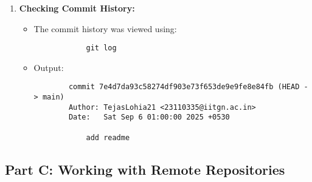 \documentclass[12pt, a4paper]{report}
\begin{document}
\begin{enumerate}
    \item \textbf{Checking Commit History:}
    \begin{itemize}
        \item The commit history was viewed using:
            \begin{verbatim}
            git log
            \end{verbatim}

        \item Output:
        \begin{verbatim}
        commit 7e4d7da93c58274df903e73f653de9e9fe8e84fb (HEAD -> main)
        Author: TejasLohia21 <23110335@iitgn.ac.in>
        Date:   Sat Sep 6 01:00:00 2025 +0530

            add readme
        \end{verbatim}
    \end{itemize}

\end{enumerate}
 
\subsection*{Part C: Working with Remote Repositories}
\end{document}
